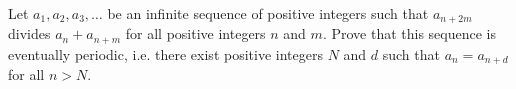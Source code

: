 Let $a_1, a_2, a_3, \ldots$ be an infinite sequence of positive integers such that $a_{n+2m}$ divides $a_n + a_{n+m}$ for all positive integers $n$ and $m$. Prove that this sequence is eventually periodic, i.e. there exist positive integers $N$ and $d$ such that $a_n = a_{n+d}$ for all $n > N$.
